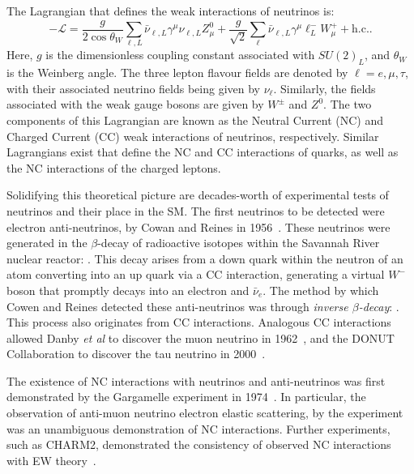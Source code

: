 The Lagrangian that defines the weak interactions of neutrinos is:
\begin{equation}
    -\mathcal{L} = \frac{g}{2\cos{\theta_{W}}}\sum_{\ell,L}\bar{\nu}_{\ell,L}\gamma^{\mu}\nu_{\ell,L}Z^{0}_{\mu}
    +\frac{g}{\sqrt{2}}\sum_{\ell}\bar{\nu}_{\ell,L}\gamma^{\mu}\ell^{-}_{L}W^{+}_{\mu} + \mathrm{h.c.}.
\end{equation}
Here, $g$ is the dimensionless coupling constant associated with $SU(2)_{L}$, and $\theta_{W}$ is the Weinberg angle. The three lepton flavour fields are denoted by $\ell=e,\mu,\tau$, with their associated neutrino fields being given by $\nu_{\ell}$. Similarly, the fields associated with the weak gauge bosons are given by $W^{\pm}$ and $Z^{0}$. The two components of this Lagrangian are known as the Neutral Current (NC) and Charged Current (CC) weak interactions of neutrinos, respectively. Similar Lagrangians exist that define the NC and CC interactions of quarks, as well as the NC interactions of the charged leptons.

Solidifying this theoretical picture are decades-worth of experimental tests of neutrinos and their place in the SM. The first neutrinos to be detected were electron anti-neutrinos, by Cowan and Reines in 1956~\cite{cowanDetectionFreeNeutrino1956,reinesNeutrino1956}. %
These neutrinos were generated in the $\beta$-decay of radioactive isotopes within the Savannah River nuclear reactor: . This decay arises from a down quark within the neutron of an atom converting into an up quark via a CC interaction, generating a virtual $W^{-}$ boson that promptly decays into an electron and $\bar{\nu}_{e}$. The method by which Cowen and Reines detected these anti-neutrinos was through \textit{inverse $\beta$-decay}: . This process also originates from CC interactions. Analogous CC interactions allowed Danby \textit{et al} to discover the muon neutrino in 1962~\cite{danbyObservationHighEnergyNeutrino1962}, %
and the DONUT Collaboration to discover the tau neutrino in 2000~\cite{kodamaObservationTauNeutrino2001}. %

The existence of NC interactions with neutrinos and anti-neutrinos was first demonstrated by the Gargamelle experiment in 1974~\cite{hasertObservationNeutrinolikeInteractions1973,hasertSearchElasticMuonneutrino1973,hasertObservationNeutrinolikeInteractions1974,blietschauEvidenceLeptonicNeutral1976}. %
In particular, the observation of anti-muon neutrino electron elastic scattering,  by the experiment was an unambiguous demonstration of NC interactions. Further experiments, such as CHARM2, demonstrated the consistency of observed NC interactions with EW theory~\cite{}. %


